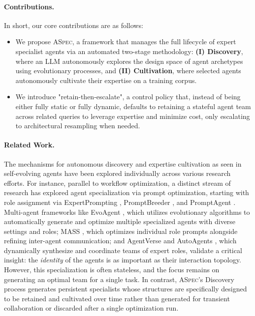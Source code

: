 \documentclass{article} %
\begin{document}
\paragraph{Contributions.} In short, our core contributions are as follows:
\begin{itemize}
     \item We propose \textsc{ASpec}, a framework that manages the full lifecycle of expert specialist agents via an automated two-stage methodology: \textbf{(I) Discovery}, where an LLM autonomously explores the design space of agent archetypes using evolutionary processes, and \textbf{(II) Cultivation}, where selected agents autonomously cultivate their expertise on a training corpus.
     
    \item We introduce "retain-then-escalate", a control policy that, instead of being either fully static or fully dynamic, defaults to retaining a stateful agent team across related queries to leverage expertise and minimize cost, only escalating to architectural resampling when needed. 
\end{itemize}

\paragraph{Related Work.}
The mechanisms for autonomous discovery and expertise cultivation as seen in self-evolving agents have been explored individually across various research efforts. For instance, parallel to workflow optimization, a distinct stream of research has explored agent specialization via prompt optimization, starting with role assignment via ExpertPrompting \citep{xu2023expertprompting}, PromptBreeder \citep{fernando2023promptbreeder}, and PromptAgent \citep{wang2023promptagent}. Multi-agent frameworks like EvoAgent \citep{yuan2024evoagent}, which utilizes evolutionary algorithms to automatically generate and optimize multiple specialized agents with diverse settings and roles; MASS \citep{zhou2025mass}, which optimizes individual role prompts alongside refining inter-agent communication; and AgentVerse \citep{chen2023agentverse} and AutoAgents \citep{chen2023autoagents}, which dynamically synthesize and coordinate teams of expert roles, validate a critical insight: the \textit{identity} of the agents is as important as their interaction topology. 
However, this specialization is often stateless, and the focus remains on generating an optimal team for a single task. In contrast, \textsc{ASpec}'s Discovery process generates persistent specialists whose structures are specifically designed to be retained and cultivated over time rather than generated for transient collaboration or discarded after a single optimization run.
\end{document}
